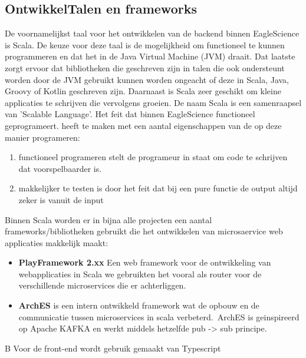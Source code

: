 \subsection{OntwikkelTalen en frameworks}\label{subsec:ontwikkeltalen-en-frameworks}
 
De voornamelijkst taal voor het ontwikkelen van de backend binnen EagleScience is Scala. De keuze voor deze taal is de mogelijkheid om functioneel te kunnen programmeren en dat het in de Java Virtual Machine (JVM) draait. Dat laatste zorgt ervoor dat bibliotheken die geschreven zijn in talen die ook ondersteunt worden door de JVM gebruikt kunnen worden ongeacht of deze in Scala, Java, Groovy of Kotlin geschreven zijn. Daarnaast is Scala zeer geschikt om kleine applicaties te schrijven die vervolgens groeien. De naam Scala is een samenraapsel van 'Scalable Language'. Het feit dat binnen EagleScience functioneel geprogrameert. heeft te maken met een aantal eigenschappen van de op deze manier programeren:
\smallskip %
\begin{enumerate}
  \item functioneel programeren stelt de programeur in staat om code te schrijven dat voorspelbaarder is.
  \item makkelijker te testen is door het feit dat bij een pure functie de output altijd zeker is vanuit de input
\end{enumerate}
Binnen Scala worden er in bijna alle projecten een aantal frameworks/bibliotheken gebruikt die het ontwikkelen van microsaervice web applicaties makkelijk maakt:
\begin{itemize}
  \item \textbf{PlayFramework 2.xx} Een web framework voor de ontwikkeling van webapplicaties in Scala we gebruikten het vooral als router voor de verschillende microservices die er achterliggen.
  \item \textbf{ArchES} is een intern ontwikkeld framework wat de opbouw en de communicatie tussen microservices in scala verbeterd.\ ArchES is geinspireerd op Apache KAFKA en werkt middels hetzelfde pub -> sub principe.
\end{itemize}

B
Voor de front-end wordt gebruik gemaakt van Typescript



